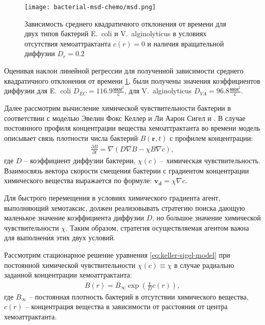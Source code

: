 \begin{figure}[ht]
    \centering
    \texttt{[image: bacterial-msd-chemo/msd.png]}
    \caption{
        Зависимость среднего квадратичного отклонения от времени для двух типов бактерий E.~coli и V.~alginolyticus в условиях отсутствия хемоаттрактанта $c(r)=0$ и наличия вращательной диффузии $D_r=0.2$
    }
    \label{fig:msd-bacteria}
\end{figure}

Оценивая наклон линейной регрессии для полученной зависимости среднего квадратичного отклонения от времени \cref{fig:msd-bacteria}, были получены значения коэффициентов диффузии для E.~coli $D_{EC}=116.9 \frac{\textrm{мкм}^2}{\textrm{с}}$, для V.~alginolyticus $D_{VA}=96.8 \frac{\textrm{мкм}^2}{\textrm{с}}$.

Далее рассмотрим вычисление химической чувствительности бактерии в соответствии с моделью Эвелин Фокс Келлер и Ли Аарон Сигел и \cite{keller_model_1971}. В случае постоянного профиля концентрации вещества хемоаттрактанта во времени модель описывает связь плотности числа бактерий $B(\textbf{r}, t)$ с профилем концентрации:
\begin{equation}
    \begin{aligned}
        \frac{\partial B}{\partial t}=\nabla (D \nabla B - \chi B \nabla c),
    \label{eq:keller-sigel-model}
    \end{aligned}
\end{equation}
где $D$ -- коэффициент диффузии бактерии, $\chi (c)$ -- химическая чувствительность. Взаимосвязь вектора скорости смещения бактерии с градиентом концентрации химического вещества выражается по формуле: 
$\boldsymbol{v_d}=\chi \nabla c$. 

Для быстрого перемещения в условиях химического градиента агент, выполняющий хемотаксис, должен реализовывать стратегию поиска дающую маленькое значение коэффициента диффузии $D$, но большое значение химической чувствительности $\chi$. Таким образом, стратегия осуществляемая агентом важна для выполнения этих двух условий.

Рассмотрим стационарное решение уравнения \cref{eq:keller-sigel-model} при постоянной химической чувствительности $\chi(c) \equiv \chi$ в случае радиально заданной концентрации хемоаттрактанта:
\begin{equation}
    \begin{aligned}
        B(r) = B_{\infty} \exp \left ( \frac{\chi}{D}c(r) \right ),
    \label{eq:keller-sigel-stationary-solution}
    \end{aligned}
\end{equation}
где $B_{\infty}$ -- постоянная плотность бактерий в отсутствии химического вещества, $c(r)$ -- концентрация вещества в зависимости от расстояния от центра хемоаттрактанта.

